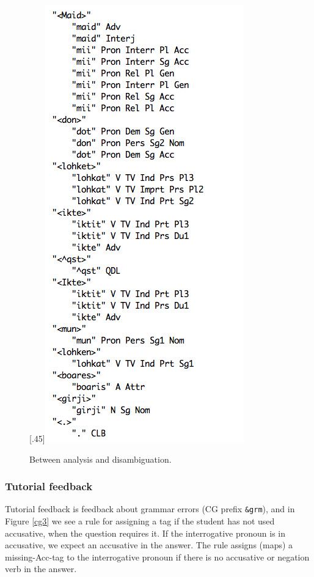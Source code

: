 \documentclass[11pt]{article}
\begin{document}
\begin{figure}[htb]
\begin{center}
\scalebox{.53}[.45]{\includegraphics{presentation/img/iktelohken3.png}}
\caption{Between analysis and disambiguation.}
\label{iktelohken}
\end{center}
\end{figure}

\subsubsection{Tutorial feedback} \label{tutorial}
Tutorial feedback is feedback about grammar errors (CG prefix \texttt{\&grm}), and in Figure \ref{cg3} we see a rule for assigning a tag if the student has not used accusative, when the question requires it. If the interrogative pronoun is in accusative, we expect an accusative in the answer.
The rule assigns (maps) a missing-Acc-tag to the interrogative pronoun if there is no accusative or negation verb in the answer.
\end{document}
